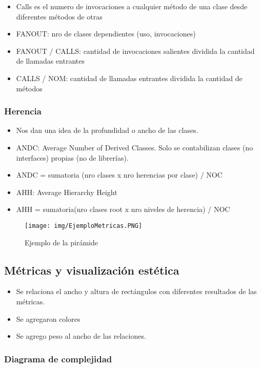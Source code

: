 \begin{itemize}
\item Calls es el numero de invocaciones a cualquier método de una clase desde diferentes métodos de otras
\item FANOUT: nro de clases dependientes (uso, invocaciones)
\item FANOUT / CALLS: cantidad de invocaciones salientes dividida la cantidad de llamadas entrantes
\item CALLS / NOM: cantidad de llamadas entrantes dividida la cantidad de métodos
\end{itemize}

\subsubsection*{Herencia}

\begin{itemize}
\item Nos dan una idea de la profundidad o ancho de las clases.
\item ANDC: Average Number of Derived Classes. Solo se contabilizan clases (no interfaces) propias (no de librerías).
\item ANDC = sumatoria (nro clases x nro herencias por clase) / NOC
\item AHH: Average Hierarchy Height
\item AHH = sumatoria(nro clases root x nro niveles de herencia) / NOC
\end{itemize}


\begin{figure}[!htb]
    \centering
    \texttt{[image: img/EjemploMetricas.PNG]}
    \caption{Ejemplo de la pirámide}
\end{figure}


\subsection*{Métricas y visualización estética}

\begin{itemize}
\item Se relaciona el ancho y altura de rectángulos con diferentes resultados de las métricas.
\item Se agregaron colores
\item Se agrego peso al ancho de las relaciones.
\end{itemize}

\subsubsection*{Diagrama de complejidad}

